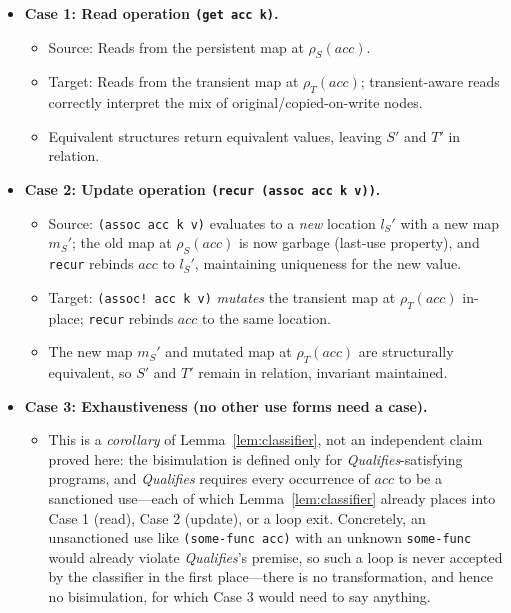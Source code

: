 \documentclass[sigplan,review,anonymous]{acmart}
\begin{document}
\begin{itemize}
    \item \textbf{Case 1: Read operation \texttt{(get acc k)}.}
    \begin{itemize}
        \item Source: Reads from the persistent map at $\rho_S(acc)$.
        \item Target: Reads from the transient map at $\rho_T(acc)$; transient-aware reads correctly interpret the mix of original/copied-on-write nodes.
        \item Equivalent structures return equivalent values, leaving $S'$ and $T'$ in relation.
    \end{itemize}
    \item \textbf{Case 2: Update operation \texttt{(recur (assoc acc k v))}.}
    \begin{itemize}
        \item Source: \texttt{(assoc acc k v)} evaluates to a \emph{new} location $l_S'$ with a new map $m_S'$; the old map at $\rho_S(acc)$ is now garbage (last-use property), and \texttt{recur} rebinds $acc$ to $l_S'$, maintaining uniqueness for the new value.
        \item Target: \texttt{(assoc! acc k v)} \emph{mutates} the transient map at $\rho_T(acc)$ in-place; \texttt{recur} rebinds $acc$ to the same location.
        \item The new map $m_S'$ and mutated map at $\rho_T(acc)$ are structurally equivalent, so $S'$ and $T'$ remain in relation, invariant maintained.
    \end{itemize}
    \item \textbf{Case 3: Exhaustiveness (no other use forms need a case).}
    \begin{itemize}
        \item This is a \emph{corollary} of Lemma~\ref{lem:classifier}, not an independent claim proved here: the bisimulation is defined only for \emph{Qualifies}-satisfying programs, and \emph{Qualifies} requires every occurrence of $acc$ to be a sanctioned use---each of which Lemma~\ref{lem:classifier} already places into Case 1 (read), Case 2 (update), or a loop exit. Concretely, an unsanctioned use like \texttt{(some-func acc)} with an unknown \texttt{some-func} would already violate \emph{Qualifies}'s premise, so such a loop is never accepted by the classifier in the first place---there is no transformation, and hence no bisimulation, for which Case 3 would need to say anything.
    \end{itemize}
\end{itemize}
\end{document}
